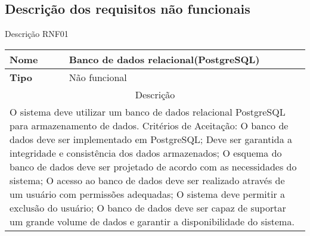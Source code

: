 \subsection{Descrição dos requisitos não funcionais }

\begin{quadro}[htb]
	\centering
	\caption{\label{Formatação do texto.}Descrição RNF01}	
	\begin{tabular}{|l|p{11cm}|}
		\hline
		\textbf{Nome}    & Banco de dados relacional(PostgreSQL)\\ \hline
		\textbf{Tipo}    & Não funcional\\ \hline
		\multicolumn{2}{|c|}{Descrição}\\ \hline
		\multicolumn{2}{|p{12cm}|}{
			O sistema deve utilizar um banco de dados relacional PostgreSQL para armazenamento de dados. \newline
			\newline Critérios de Aceitação: \newline
			O banco de dados deve ser implementado em PostgreSQL;
			Deve ser garantida a integridade e consistência dos dados armazenados;\newline
			\newline O esquema do banco de dados deve ser projetado de acordo com as necessidades do sistema; \newline
			\newline O acesso ao banco de dados deve ser realizado através de um usuário com permissões adequadas; \newline
			\newline O sistema deve permitir a exclusão do usuário; \newline
			O banco de dados deve ser capaz de suportar um grande volume de dados e garantir a disponibilidade do sistema.
			} \\ \hline
	\end{tabular}
\end{quadro}

